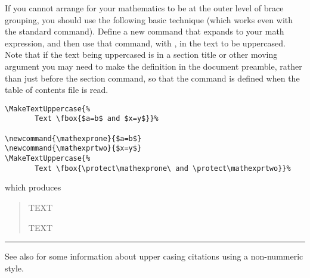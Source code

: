 If you cannot arrange for your mathematics to be at the outer level of
brace grouping, you should use the following basic technique (which
works even with the standard \cmd{\MakeUppercase} command). Define a
new command that expands to your math expression, and then use that
command, with \cmd{\protect}, in the text to be uppercased. Note that
if the text being uppercased is in a section title or other moving
argument you may need to make the definition in the document preamble,
rather than just before the section command, so that the command is
defined when the table of contents file is read.
\begin{verbatim}
\MakeTextUppercase{%
       Text \fbox{$a=b$ and $x=y$}}%

\newcommand{\mathexprone}{$a=b$}
\newcommand{\mathexprtwo}{$x=y$}
\MakeTextUppercase{%
       Text \fbox{\protect\mathexprone\ and \protect\mathexprtwo}}%
\end{verbatim}
which produces
\begin{quotation}
\MakeTextUppercase{%
       Text }%

\newcommand{\mathexprone}{$a=b$}
\newcommand{\mathexprtwo}{$x=y$}
\MakeTextUppercase{%
       Text \fbox{\protect\mathexprone\ and \protect\mathexprtwo}}%
\end{quotation}


\fancybreak{}

See also \cite{textcase} for some information about upper casing
citations using a non-nummeric style.









